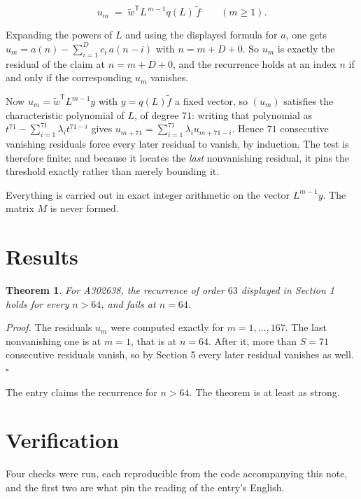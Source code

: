 \documentclass[11pt]{article}
\newtheorem{theorem}{Theorem}
\theoremstyle{definition}
\begin{document}
\[u_m \;=\; \tilde w^{\mathsf T} L^{\,m-1} q(L)\,\tilde f \qquad (m \ge 1).\]

Expanding the powers of $L$ and using the displayed formula for $a$, one gets $u_m = a(n) - \sum_{i=1}^{D} c_i\,a(n-i)$ with $n = m + D + 0$. So $u_m$ is exactly the residual of the claim at $n = m + D + 0$, and the recurrence holds at an index $n$ if and only if the corresponding $u_m$ vanishes.

Now $u_m = \tilde w^{\mathsf T} L^{m-1} y$ with $y = q(L)\tilde f$ a fixed vector, so $(u_m)$ satisfies the characteristic polynomial of $L$, of degree $71$: writing that polynomial as $t^{71} - \sum_{i=1}^{71} \lambda_i t^{71-i}$ gives $u_{m+71} = \sum_{i=1}^{71} \lambda_i u_{m+71-i}$. Hence $71$ consecutive vanishing residuals force every later residual to vanish, by induction. The test is therefore finite; and because it locates the {\itshape last} nonvanishing residual, it pins the threshold exactly rather than merely bounding it.

Everything is carried out in exact integer arithmetic on the vector $L^{m-1}y$. The matrix $M$ is never formed.

\section{Results}

\begin{theorem} For A302638, the recurrence of order $63$ displayed in Section 1 holds for every $n > 64$, and fails at $n = 64$.\end{theorem}

{\itshape Proof.} The residuals $u_m$ were computed exactly for $m = 1,\dots,167$. The last nonvanishing one is at $m = 1$, that is at $n = 64$. After it, more than $S = 71$ consecutive residuals vanish, so by Section 5 every later residual vanishes as well. $\square$

The entry claims the recurrence for $n > 64$. The theorem is at least as strong.

\section{Verification}

Four checks were run, each reproducible from the code accompanying this note, and the first two are what pin the reading of the entry's English.
\end{document}
